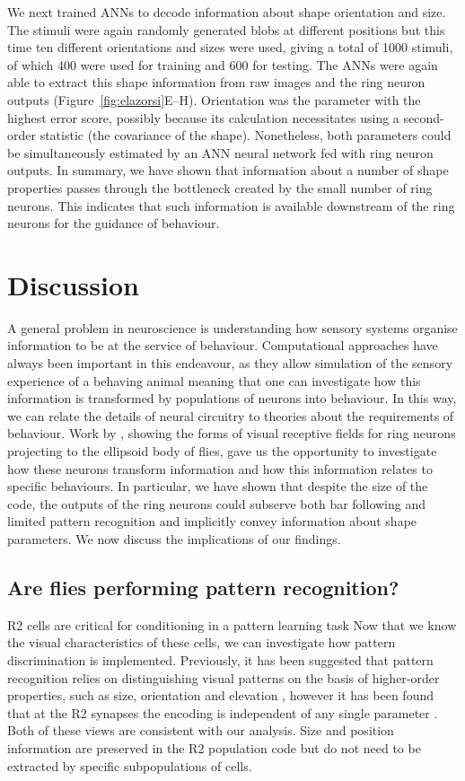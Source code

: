 \documentclass[10pt]{article}
\begin{document}
We next trained ANNs to decode information about shape orientation and size. The stimuli were again randomly generated blobs at different positions but this time ten different orientations and sizes were used, giving a total of 1000 stimuli, of which 400 were used for training and 600 for testing. The ANNs were again able to extract this shape information from raw images and the ring neuron outputs (Figure~\ref{fig:elazorsi}E--H). Orientation was the parameter with the highest error score, possibly because its calculation necessitates using a second-order statistic (the covariance of the shape). Nonetheless, both parameters could be simultaneously estimated by an ANN neural network fed with ring neuron outputs. 
In summary, we have shown that information about a number of shape properties passes through the bottleneck created by the small number of ring neurons. This indicates that such information is available downstream of the ring neurons for the guidance of behaviour.

\section*{Discussion}
A general problem in neuroscience is understanding how sensory systems organise information to be at the service of behaviour. Computational approaches have always been important in this endeavour, as they allow simulation of the sensory experience of a behaving animal meaning that one can investigate how this information is transformed by populations of neurons into behaviour. In this way, we can relate the details of neural circuitry to theories about the requirements of behaviour. Work by \cite{Seelig2013}, showing the forms of visual receptive fields for ring neurons projecting to the ellipsoid body of flies, gave us the opportunity to investigate how these neurons transform information and how this information relates to specific behaviours. In particular, we have shown that despite the size of the code, the outputs of the ring neurons could subserve both bar following and limited pattern recognition and implicitly convey information about shape parameters. We now discuss the implications of our findings.

\subsection*{Are flies performing pattern recognition?}
R2 cells are critical for conditioning in a pattern learning task \cite{Pan2009} Now that we know the visual characteristics of these cells, we can investigate how pattern discrimination is implemented. Previously, it has been suggested that pattern recognition relies on distinguishing visual patterns on the basis of higher-order properties, such as size, orientation and elevation \cite{Pan2009,Ernst1999}, however it has been found that at the R2 synapses the encoding is independent of any single parameter \cite{Liu2006}. Both of these views are consistent with our analysis. Size and position information are preserved in the R2 population code but do not need to be extracted by specific subpopulations of cells.
\end{document}
